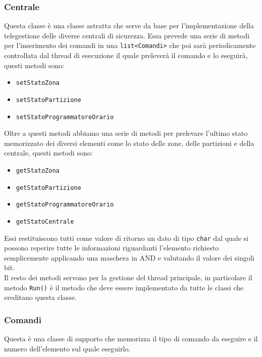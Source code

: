 \subsubsection{Centrale}
Questa classe è una classe astratta che serve da base per l'implementazione della telegestione delle diverse centrali di sicurezza. Essa prevede una serie di metodi per l'inserimento dei comandi in una \texttt{list<Comandi>} che poi sarà periodicamente controllata dal thread di esecuzione il quale preleverà il comando e lo eseguirà, questi metodi sono:
\begin{itemize}
\item \texttt{setStatoZona}
\item \texttt{setStatoPartizione}
\item \texttt{setStatoProgrammatoreOrario}
\end{itemize}
Oltre a questi metodi abbiamo una serie di metodi per prelevare l'ultimo stato memorizzato dei diversi elementi come lo stato delle zone, delle partizioni e della centrale, questi metodi sono:
\begin{itemize}
	\item \texttt{getStatoZona}
	\item \texttt{getStatoPartizione}
	\item \texttt{getStatoProgrammatoreOrario}
	\item \texttt{getStatoCentrale}
\end{itemize}
Essi restituiscono tutti come valore di ritorno un dato di tipo \texttt{char} dal quale si possono reperire tutte le informazioni riguardanti l'elemento richiesto semplicemente applicando una maschera in AND e valutando il valore dei singoli bit.\\
Il resto dei metodi servono per la gestione del thread principale, in particolare il metodo \texttt{Run()} è il metodo che deve essere implementato da tutte le classi che ereditano questa classe.
\subsubsection{Comandi}
Questa è una classe di supporto che memorizza il tipo di comando da eseguire e il numero dell'elemento sul quale eseguirlo.
